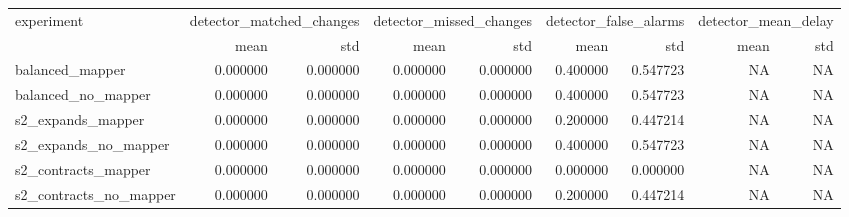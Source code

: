 \begin{tabular}{lrrrrrrrr}
\toprule
experiment & \multicolumn{2}{r}{detector\_matched\_changes} & \multicolumn{2}{r}{detector\_missed\_changes} & \multicolumn{2}{r}{detector\_false\_alarms} & \multicolumn{2}{r}{detector\_mean\_delay} \\
 & mean & std & mean & std & mean & std & mean & std \\
\midrule
balanced\_mapper & 0.000000 & 0.000000 & 0.000000 & 0.000000 & 0.400000 & 0.547723 & NA & NA \\
balanced\_no\_mapper & 0.000000 & 0.000000 & 0.000000 & 0.000000 & 0.400000 & 0.547723 & NA & NA \\
s2\_expands\_mapper & 0.000000 & 0.000000 & 0.000000 & 0.000000 & 0.200000 & 0.447214 & NA & NA \\
s2\_expands\_no\_mapper & 0.000000 & 0.000000 & 0.000000 & 0.000000 & 0.400000 & 0.547723 & NA & NA \\
s2\_contracts\_mapper & 0.000000 & 0.000000 & 0.000000 & 0.000000 & 0.000000 & 0.000000 & NA & NA \\
s2\_contracts\_no\_mapper & 0.000000 & 0.000000 & 0.000000 & 0.000000 & 0.200000 & 0.447214 & NA & NA \\
\bottomrule
\end{tabular}
